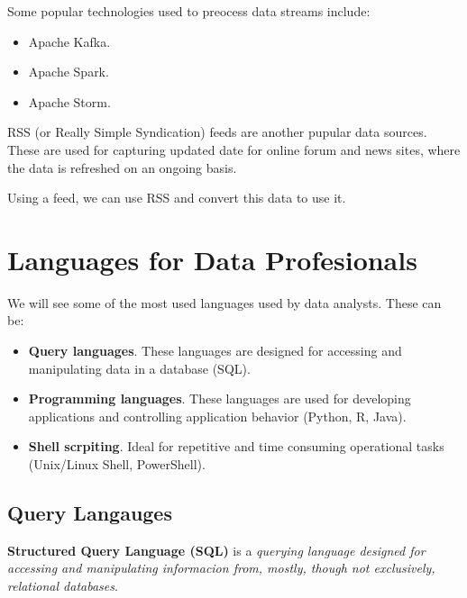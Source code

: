 \documentclass[../../ibm_data_analysis.tex]{subfiles}
\begin{document}
    \begin{obs}
        Some popular technologies used to preocess data streams include:
        \begin{itemize}
            \item Apache Kafka.
            \item Apache Spark.
            \item Apache Storm.
        \end{itemize}
    \end{obs}

    \begin{obs}
        RSS (or Really Simple Syndication) feeds are another pupular data sources. These are used for capturing updated date for online forum and news sites, where the data is refreshed on an ongoing basis.

        Using a feed, we can use RSS and convert this data to use it.
    \end{obs}

    \section{Languages for Data Profesionals}

    We will see some of the most used languages used by data analysts. These can be:
    \begin{itemize}
        \item \textbf{Query languages}. These languages are designed for accessing and manipulating data in a database (SQL).
        \item \textbf{Programming languages}. These languages are used for developing applications and controlling application behavior (Python, R, Java).
        \item \textbf{Shell scrpiting}. Ideal for repetitive and time consuming operational tasks (Unix/Linux Shell, PowerShell).
    \end{itemize}

    \subsection{Query Langauges}

    \begin{mydef}
        \textbf{Structured Query Language (SQL)} is a \textit{querying language designed for accessing and manipulating informacion from, mostly, though not exclusively, relational databases}.
    \end{mydef}
\end{document}
